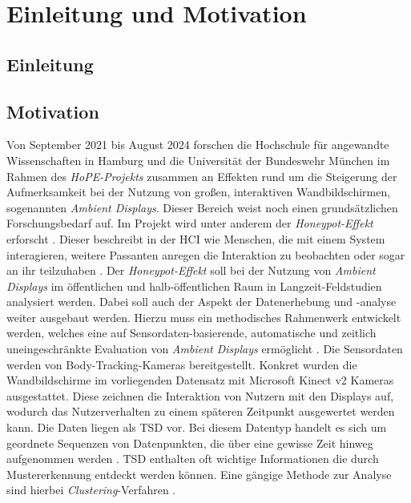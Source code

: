 \chapter{Einleitung und Motivation}
\label{chapter1}

\section{Einleitung}
\label{chapter1-Einleitung}


\section{Motivation}
\label{chapter1-Motivation}
Von September 2021 bis August 2024 forschen die Hochschule für angewandte Wissenschaften in Hamburg
und die Universität der Bundeswehr München im Rahmen des \emph{HoPE-Projekts} zusammen an Effekten
rund um die Steigerung der Aufmerksamkeit bei der Nutzung von großen, interaktiven Wandbildschirmen,
sogenannten \emph{Ambient Displays}.
Dieser Bereich weist noch einen grundsätzlichen Forschungsbedarf auf.
Im Projekt wird unter anderem der \emph{Honeypot-Effekt} erforscht \citep{unibw_honeypot-effekt_2021}.
Dieser beschreibt in der \ac{HCI} wie Menschen, die mit einem System interagieren,
weitere Passanten anregen die Interaktion zu beobachten oder sogar an ihr teilzuhaben \citep{wouters_uncovering_2016}.
Der \emph{Honeypot-Effekt} soll bei der Nutzung von \emph{Ambient Displays} im öffentlichen
und halb-öffentlichen Raum in Langzeit-Feldstudien analysiert werden.
Dabei soll auch der Aspekt der Datenerhebung und -analyse weiter ausgebaut werden.
Hierzu muss ein methodisches Rahmenwerk entwickelt werden, welches eine auf Sensordaten-basierende,
automatische und zeitlich uneingeschränkte Evaluation von \emph{Ambient Displays} ermöglicht \citep{unibw_honeypot-effekt_2021}.
Die Sensordaten werden von Body-Tracking-Kameras bereitgestellt.
Konkret wurden die Wandbildschirme im vorliegenden Datensatz mit Microsoft Kinect v2 Kameras ausgestattet.
Diese zeichnen die Interaktion von Nutzern mit den Displays auf,
wodurch das Nutzerverhalten zu einem späteren Zeitpunkt ausgewertet werden kann.
Die Daten liegen als \ac{TSD} vor.
Bei diesem Datentyp handelt es sich um geordnete Sequenzen von Datenpunkten,
die über eine gewisse Zeit hinweg aufgenommen werden \citep{ali_clustering_2019}.
\ac{TSD} enthalten oft wichtige Informationen die durch Mustererkennung entdeckt werden können.
Eine gängige Methode zur Analyse sind hierbei \emph{Clustering}-Verfahren \citep{aghabozorgi_time-series_2015}.
